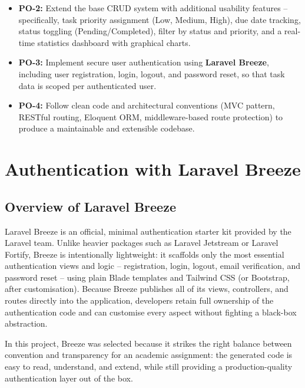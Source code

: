 \documentclass[12pt,a4paper]{report}
\begin{document}
\begin{titlepage}
\begin{itemize}[leftmargin=1.5cm]
    \item \textbf{PO-2:} Extend the base CRUD system with additional usability features
    -- specifically, task priority assignment (Low, Medium, High), due date tracking,
    status toggling (Pending/Completed), filter by status and priority, and a real-time
    statistics dashboard with graphical charts.

    \item \textbf{PO-3:} Implement secure user authentication using \textbf{Laravel
    Breeze}, including user registration, login, logout, and password reset, so that
    task data is scoped per authenticated user.

    \item \textbf{PO-4:} Follow clean code and architectural conventions (MVC pattern,
    RESTful routing, Eloquent ORM, middleware-based route protection) to produce a
    maintainable and extensible codebase.
\end{itemize}

\chapter{Authentication with Laravel Breeze}

\section{Overview of Laravel Breeze}

Laravel Breeze is an official, minimal authentication starter kit provided by
the Laravel team. Unlike heavier packages such as Laravel Jetstream or Laravel
Fortify, Breeze is intentionally lightweight: it scaffolds only the most essential
authentication views and logic -- registration, login, logout, email verification,
and password reset -- using plain Blade templates and Tailwind CSS (or Bootstrap,
after customisation). Because Breeze publishes all of its views, controllers, and
routes directly into the application, developers retain full ownership of the
authentication code and can customise every aspect without fighting a black-box
abstraction.

In this project, Breeze was selected because it strikes the right balance between
convention and transparency for an academic assignment: the generated code is
easy to read, understand, and extend, while still providing a production-quality
authentication layer out of the box.


\end{titlepage}
\end{document}

